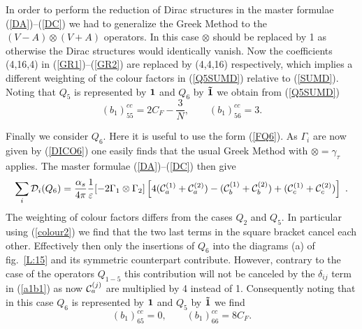 \documentclass[12pt,rotate]{article}
\def\as{\alpha_s}
\newcommand{\be}{\begin{equation}}
\newcommand{\ee}{\end{equation}}
\begin{document}
\begin{itemize}
\begin{itemize}
In order to perform the reduction of Dirac structures in the
master formulae (\ref{DA})--(\ref{DC}) we had to generalize the Greek
Method to the $(V-A)\otimes(V+A)$ operators. In this case $\otimes$
should be replaced by 1 as otherwise the Dirac structures would
identically vanish. Now the coefficients (4,16,4) in 
(\ref{GR1})--(\ref{GR2}) are
replaced by (4,4,16) respectively, which implies a different
weighting of the colour factors in (\ref{Q5SUMD}) 
relative to (\ref{SUMD}). Noting
that $Q_5$ is represented by ${\bf 1}$ and $Q_6$ by ${\bf \tilde 1}$
we obtain from (\ref{Q5SUMD})
\be\label{Q5CROW}
(b_1)_{55}^{cc}=2 C_F-\frac{3}{N},\quad\quad
(b_1)_{56}^{cc}=3.
\ee

Finally we consider $Q_6$. Here it is useful to use the form
(\ref{FQ6}). As $\Gamma_i$ are now given by (\ref{DICO6}) one 
easily finds that the usual Greek Method with $\otimes=\gamma_\tau$
applies. The master formulae (\ref{DA})--(\ref{DC}) then give
\be\label{Q6SUMD}
\sum_i {\cal D}_i(Q_6)=\frac{\as}{4\pi} \frac{1}{\varepsilon}
[-2\Gamma_1\otimes\Gamma_2]
\left[4({\cal C}_a^{(1)}+{\cal C}_a^{(2)})-
 ({\cal C}_b^{(1)}+{\cal C}_b^{(2)})+
({\cal C}_c^{(1)}+{\cal C}_c^{(2)})\right]~.
\ee
The weighting of colour factors differs from the cases $Q_2$ and $Q_5$.
In particular using (\ref{colour2}) we find that the two 
last terms in the square
bracket cancel each other. Effectively then only the insertions of
$Q_6$ into the diagrams (a) of fig.~\ref{L:15}
and its symmetric counterpart contribute. However, contrary to
the case of the operators $Q_{1-5}$ this contribution will not be canceled
by the $\delta_{ij}$ term in (\ref{a1b1}) as now ${\cal C}_a^{(j)}$ 
are multiplied
by 4 instead of 1. Consequently noting that in this case
$Q_6$ is represented by ${\bf 1}$ and $Q_5$ by ${\bf \tilde 1}$
we find
\be\label{Q6CROW}
(b_1)_{65}^{cc}=0,\quad\quad
(b_1)_{66}^{cc}=8 C_F. 
\ee


\end{itemize}
\end{itemize}
\end{document}
